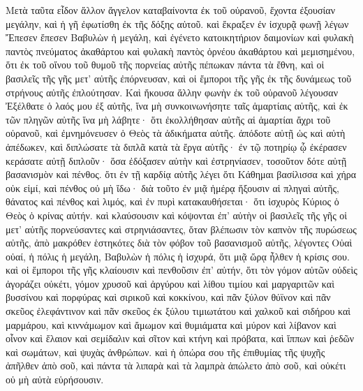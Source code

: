 \begin{pages}
    \begin{Rightside}
        \beginnumbering
		Μετὰ ταῦτα εἶδον ἄλλον ἄγγελον καταβαίνοντα ἐκ τοῦ οὐρανοῦ, ἔχοντα ἐξουσίαν μεγάλην, καὶ ἡ γῆ ἐφωτίσθη ἐκ τῆς δόξης αὐτοῦ. καὶ ἔκραξεν ἐν ἰσχυρᾷ φωνῇ λέγων Ἔπεσεν ἔπεσεν Βαβυλὼν ἡ μεγάλη, καὶ ἐγένετο κατοικητήριον δαιμονίων καὶ φυλακὴ παντὸς πνεύματος ἀκαθάρτου καὶ φυλακὴ παντὸς ὀρνέου ἀκαθάρτου καὶ μεμισημένου, ὅτι ἐκ τοῦ οἴνου τοῦ θυμοῦ τῆς πορνείας αὐτῆς πέπωκαν πάντα τὰ ἔθνη, καὶ οἱ βασιλεῖς τῆς γῆς μετ’ αὐτῆς ἐπόρνευσαν, καὶ οἱ ἔμποροι τῆς γῆς ἐκ τῆς δυνάμεως τοῦ στρήνους αὐτῆς ἐπλούτησαν. 
		\pend
		\pstart
		Καὶ ἤκουσα ἄλλην φωνὴν ἐκ τοῦ οὐρανοῦ λέγουσαν Ἐξέλθατε ὁ λαός μου ἐξ αὐτῆς, ἵνα μὴ συνκοινωνήσητε ταῖς ἁμαρτίαις αὐτῆς, καὶ ἐκ τῶν πληγῶν αὐτῆς ἵνα μὴ λάβητε· ὅτι ἐκολλήθησαν αὐτῆς αἱ ἁμαρτίαι ἄχρι τοῦ οὐρανοῦ, καὶ ἐμνημόνευσεν ὁ Θεὸς τὰ ἀδικήματα αὐτῆς. ἀπόδοτε αὐτῇ ὡς καὶ αὐτὴ ἀπέδωκεν, καὶ διπλώσατε τὰ διπλᾶ κατὰ τὰ ἔργα αὐτῆς· ἐν τῷ ποτηρίῳ ᾧ ἐκέρασεν κεράσατε αὐτῇ διπλοῦν· 
		\pend
		\pstart
		ὅσα ἐδόξασεν αὐτὴν καὶ ἐστρηνίασεν, τοσοῦτον δότε αὐτῇ βασανισμὸν καὶ πένθος. ὅτι ἐν τῇ καρδίᾳ αὐτῆς λέγει ὅτι Κάθημαι βασίλισσα καὶ χήρα οὐκ εἰμί, καὶ πένθος οὐ μὴ ἴδω· διὰ τοῦτο ἐν μιᾷ ἡμέρᾳ ἥξουσιν αἱ πληγαὶ αὐτῆς, θάνατος καὶ πένθος καὶ λιμός, καὶ ἐν πυρὶ κατακαυθήσεται· ὅτι ἰσχυρὸς Κύριος ὁ Θεὸς ὁ κρίνας αὐτήν. 
		\pend
		\pstart
		καὶ κλαύσουσιν καὶ κόψονται ἐπ’ αὐτὴν οἱ βασιλεῖς τῆς γῆς οἱ μετ’ αὐτῆς πορνεύσαντες καὶ στρηνιάσαντες, ὅταν βλέπωσιν τὸν καπνὸν τῆς πυρώσεως αὐτῆς, ἀπὸ μακρόθεν ἑστηκότες διὰ τὸν φόβον τοῦ βασανισμοῦ αὐτῆς, λέγοντες Οὐαὶ οὐαί, ἡ πόλις ἡ μεγάλη, Βαβυλὼν ἡ πόλις ἡ ἰσχυρά, ὅτι μιᾷ ὥρᾳ ἦλθεν ἡ κρίσις σου. 
		\pend
		\pstart
		καὶ οἱ ἔμποροι τῆς γῆς κλαίουσιν καὶ πενθοῦσιν ἐπ’ αὐτήν, ὅτι τὸν γόμον αὐτῶν οὐδεὶς ἀγοράζει οὐκέτι, γόμον χρυσοῦ καὶ ἀργύρου καὶ λίθου τιμίου καὶ μαργαριτῶν καὶ βυσσίνου καὶ πορφύρας καὶ σιρικοῦ καὶ κοκκίνου, καὶ πᾶν ξύλον θύϊνον καὶ πᾶν σκεῦος ἐλεφάντινον καὶ πᾶν σκεῦος ἐκ ξύλου τιμιωτάτου καὶ χαλκοῦ καὶ σιδήρου καὶ μαρμάρου, καὶ κιννάμωμον καὶ ἄμωμον καὶ θυμιάματα καὶ μύρον καὶ λίβανον καὶ οἶνον καὶ ἔλαιον καὶ σεμίδαλιν καὶ σῖτον καὶ κτήνη καὶ πρόβατα, καὶ ἵππων καὶ ῥεδῶν καὶ σωμάτων, καὶ ψυχὰς ἀνθρώπων. 
		\pend
		\pstart
		καὶ ἡ ὀπώρα σου τῆς ἐπιθυμίας τῆς ψυχῆς ἀπῆλθεν ἀπὸ σοῦ, καὶ πάντα τὰ λιπαρὰ καὶ τὰ λαμπρὰ ἀπώλετο ἀπὸ σοῦ, καὶ οὐκέτι οὐ μὴ αὐτὰ εὑρήσουσιν. 

\end{Rightside}
\end{pages}
